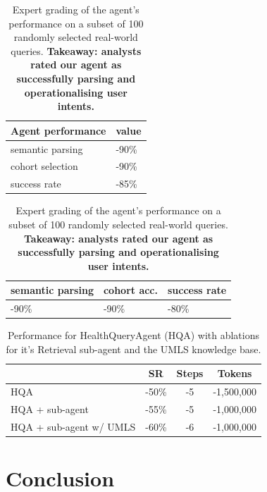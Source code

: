 \documentclass[11pt]{article}
\begin{document}
\begin{table}[ht]
\centering
\begin{tabular}{|l|l|}
\hline
	Agent performance & value \\
\hline

	semantic parsing & -90\% 	\\
	cohort selection & -90\%	\\
	success rate	 & -85\%	\\
\hline
\end{tabular}
\caption{
	Expert grading of the agent's performance on a subset of 100 randomly selected real-world queries.
	\textbf{Takeaway: analysts rated our agent as successfully parsing and operationalising user intents.}	
}
\label{tab:user-feedback}
\end{table}

\begin{table}[ht]
\centering
\begin{tabular}{|l|l|l|}
\hline
	semantic parsing  & cohort acc. & success rate	\\	
\hline
	-90\%		  & -90\%		& -80\%	\\
\hline	
\end{tabular}
\caption{
	Expert grading of the agent's performance on a subset of 100 randomly selected real-world queries.
	\textbf{Takeaway: analysts rated our agent as successfully parsing and operationalising user intents.}	
}
\label{tab:expert-feedback}
\end{table}

\begin{table}[h]
\centering
\begin{tabular}{|l|c|c|c|}
\hline
				& \textbf{SR} & \textbf{Steps} & \textbf{Tokens} \\
\hline
HQA 				& -50\% & -5 & -1,500,000 \\
\hline
HQA + sub-agent			& -55\% & -5 & -1,000,000 \\
\hline
HQA + sub-agent w/ UMLS		& -60\% & -6 & -1,000,000 \\
\hline
\end{tabular}
	\caption{Performance for HealthQueryAgent (HQA) with ablations for it's Retrieval sub-agent and the UMLS knowledge base.}
	\label{tab:results-for-single-queries}
\end{table}



\section{Conclusion}
\end{document}

